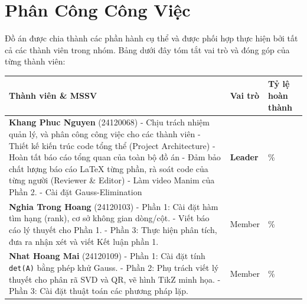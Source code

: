 \newpage
\section{Phân Công Công Việc}

Đồ án được chia thành các phần hành cụ thể và được phối hợp thực hiện bởi tất cả các thành viên trong nhóm. Bảng dưới đây tóm tắt vai trò và đóng góp của từng thành viên:

\begin{table}[H]
    \centering
    \renewcommand{\arraystretch}{1.5} %
    \begin{tabular}{|p{}|>{\centering\arraybackslash}p{}|>{\centering\arraybackslash}p{}|}
        \hline
        \rowcolor{primaryblue!20}
        \textbf{Thành viên \& MSSV} & \textbf{Vai trò} & \textbf{Tỷ lệ hoàn thành} \\ \hline
        \textbf{Khang Phuc Nguyen} (24120068) \newline
        - Chịu trách nhiệm quản lý, và phân công công việc cho các thành viên \newline
        - Thiết kế kiến trúc code tổng thể (Project Architecture) \newline
        - Hoàn tất báo cáo tổng quan của toàn bộ đồ án \newline
        - Đảm bảo chất lượng báo cáo LaTeX từng phần, rà soát code của từng người (Reviewer \& Editor) \newline
        - Làm video Manim của Phần 2.
        - Cài đặt Gauss-Elimination
        & \textbf{Leader} & 100\% \\ \hline
        
        \textbf{Nghia Trong Hoang} (24120103) \newline 
        - Phần 1: Cài đặt hàm tìm hạng (rank), cơ sở không gian dòng/cột. \newline
        - Viết báo cáo lý thuyết cho Phần 1. \newline
        - Phần 3: Thực hiện phân tích, đưa ra nhận xét và viết Kết luận phần 1.
        & Member & 100\% \\ \hline
        
        \textbf{Nhat Hoang Mai} (24120109) \newline 
        - Phần 1: Cài đặt tính \texttt{det(A)} bằng phép khử Gauss. \newline
        - Phần 2: Phụ trách viết lý thuyết cho phân rã SVD và QR, vẽ hình TikZ minh họa. \newline
        - Phần 3: Cài đặt thuật toán các phương pháp lặp.
        & Member & 100\% \\ \hline
        

\end{tabular}
\end{table}
